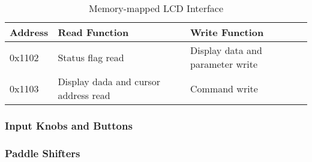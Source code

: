 \begin{table}
\caption{Memory-mapped LCD Interface}
\centering{}
\begin{tabular}{|l|l|l|}
\hline 
Address  & Read Function  & Write Function\tabularnewline
\hline
\hline 
0x1102  & Status flag read  & Display data and parameter write\tabularnewline
\hline 
0x1103  & Display dada and cursor address read  & Command write\tabularnewline
\hline
\end{tabular}
\end{table}

\subsubsection{Input Knobs and Buttons}


\subsubsection{Paddle Shifters}